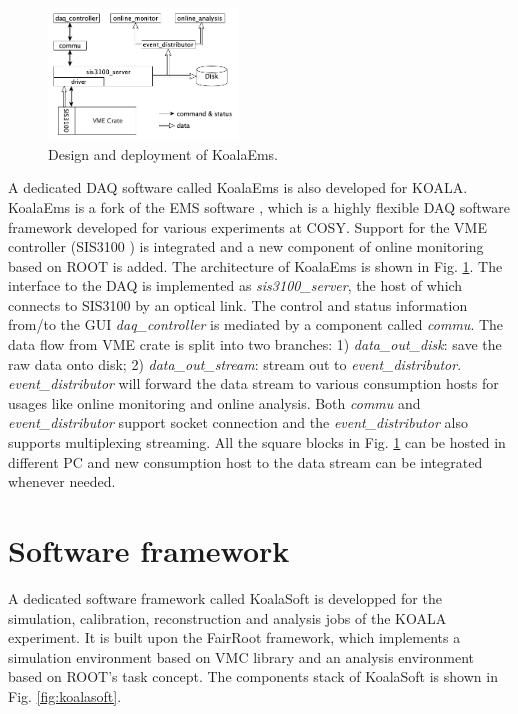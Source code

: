 \documentclass[number,5p]{elsarticle}
\begin{document}
\begin{figure}[htbp]
\centering
\includegraphics[width=0.45\textwidth]{./koalaems_deployment.png}
\caption{Design and deployment of KoalaEms.}
\label{fig:koalaems}
\end{figure}

A dedicated DAQ software called KoalaEms is also developed for KOALA.
KoalaEms is a fork of the EMS software \cite{ems}, which is a highly flexible DAQ software framework developed for various experiments at COSY.
Support for the VME controller (SIS3100 \cite{sis}) is integrated and a new component of online monitoring based on ROOT is added.
The architecture of KoalaEms is shown in Fig. \ref{fig:koalaems}.
The interface to the DAQ is implemented as \emph{sis3100\_server}, the host of which
connects to SIS3100 by an optical link.
The control and status information from/to the GUI \emph{daq\_controller} is mediated by a component called \emph{commu}.
The data flow from VME crate is split into two branches: 1) \emph{data\_out\_disk}: save the raw data onto disk; 2) \emph{data\_out\_stream}: stream out to \emph{event\_distributor}.
\emph{event\_distributor} will forward the data stream to various consumption hosts for usages like online monitoring and online analysis.
Both \emph{commu} and \emph{event\_distributor} support socket connection and the \emph{event\_distributor} also supports multiplexing streaming.
All the square blocks in Fig. \ref{fig:koalaems} can be hosted in different PC and new consumption host to the data stream can be integrated whenever needed.


\section{Software framework}
\label{sec:software}

A dedicated software framework called KoalaSoft is developped for the simulation, calibration, reconstruction and analysis jobs of the KOALA experiment.
It is built upon the FairRoot \cite{fairroot} framework, which implements a simulation environment based on VMC \cite{vmc} library and an analysis environment based on ROOT's task concept.
The components stack of KoalaSoft is shown in Fig. \ref{fig:koalasoft}.
\end{document}
